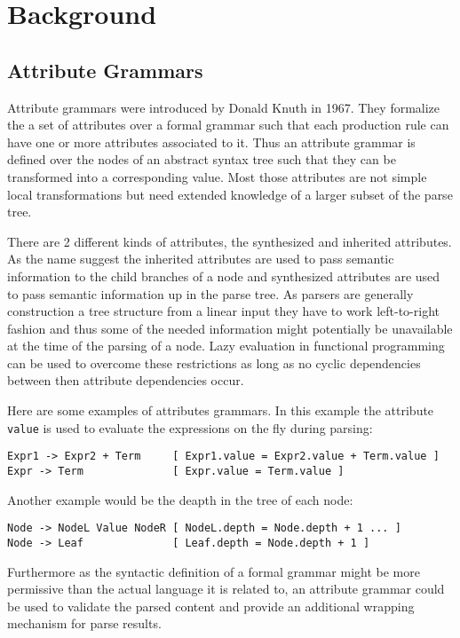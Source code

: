 \section{Background}
\subsection{Attribute Grammars}
Attribute grammars were introduced by Donald Knuth in 1967. They formalize the a set of attributes over a formal grammar such that each production rule can have one or more attributes associated to it. Thus an attribute grammar is defined over the nodes of an abstract syntax tree such that they can be transformed into a corresponding value. Most those attributes are not simple local transformations but need extended knowledge of a larger subset of the parse tree.

There are 2 different kinds of attributes, the synthesized and inherited attributes. As the name suggest the inherited attributes are used to pass semantic information to the child branches of a node and synthesized attributes are used to pass semantic information up in the parse tree. As parsers are generally construction a tree structure from a linear input they have to work left-to-right fashion and thus some of the needed information might potentially be unavailable at the time of the parsing of a node. Lazy evaluation in functional programming can be used to overcome these restrictions as long as no cyclic dependencies between then attribute dependencies occur.

Here are some examples of attributes grammars.
In this example the attribute \verb/value/ is used to evaluate the expressions on the fly during parsing:
\begin{verbatim}
Expr1 -> Expr2 + Term     [ Expr1.value = Expr2.value + Term.value ]
Expr -> Term              [ Expr.value = Term.value ]
\end{verbatim}
Another example would be the deapth in the tree of each node:
\begin{verbatim}
Node -> NodeL Value NodeR [ NodeL.depth = Node.depth + 1 ... ] 
Node -> Leaf              [ Leaf.depth = Node.depth + 1 ]
\end{verbatim}

Furthermore as the syntactic definition of a formal grammar might be more permissive than the actual language it is related to, an attribute grammar could be used to validate the parsed content and provide an additional wrapping mechanism for parse results. 

